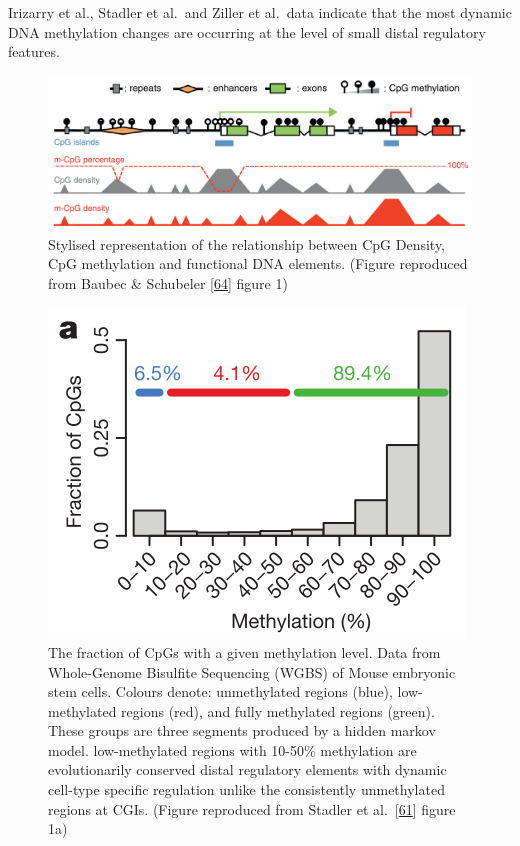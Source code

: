 \documentclass[
]{book}
\begin{document}
Irizarry et al., Stadler et al.~and Ziller et al.~data indicate that the most dynamic DNA methylation changes are occurring at the level of small distal regulatory features.

\begin{figure}

{\centering \includegraphics[width=0.8\linewidth]{figs/Baubec2014_fig1} 

}

\caption{Stylised representation of the relationship between CpG Density, CpG methylation and functional DNA elements. (Figure reproduced from Baubec \& Schubeler {[}\protect\hyperlink{ref-Baubec2014}{64}{]} figure 1)}\label{fig:Baubec2014fig1}
\end{figure}



\begin{figure}

{\centering \includegraphics[width=0.8\linewidth]{figs/CpGfreqVsDNAm} 

}

\caption{The fraction of CpGs with a given methylation level. Data from Whole-Genome Bisulfite Sequencing (WGBS) of Mouse embryonic stem cells. Colours denote: unmethylated regions (blue), low-methylated regions (red), and fully methylated regions (green). These groups are three segments produced by a hidden markov model. low-methylated regions with 10-50\% methylation are evolutionarily conserved distal regulatory elements with dynamic cell-type specific regulation unlike the consistently unmethylated regions at CGIs. (Figure reproduced from Stadler et al.~{[}\protect\hyperlink{ref-Stadler2011}{61}{]} figure 1a)}\label{fig:CpGfreqVsDNAm}
\end{figure}
\end{document}
